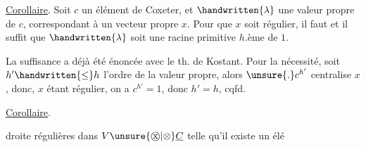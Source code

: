\uline{Corollaire}. Soit $c$ un élément de Coxeter, et $\handwritten{\lambda}$ une valeur propre de $c$, correspondant à un vecteur propre $x$. Pour que $x$ soit régulier, il faut et il suffit que $\handwritten{\lambda}$ soit une racine primitive $h$.ème de $1$.
\reversemarginpar{}\normalmarginpar

La suffisance a déjà été énoncée avec le th. de Kostant. Pour la nécessité, soit $h'\handwritten{\leq}h$ l'ordre de la valeur propre, alors $\unsure{\mathbin{.}}c^{h'}$ centralise $x$, donc, $x$ étant régulier, on a $c^{h'}=1$, donc $h'=h$, cqfd.

\uline{Corollaire}.  droite régulières dans $V\unsure{\mathbin{\text{\textcircled{x}}}|\otimes}\underline{C}$ telle qu'il existe un élé%
